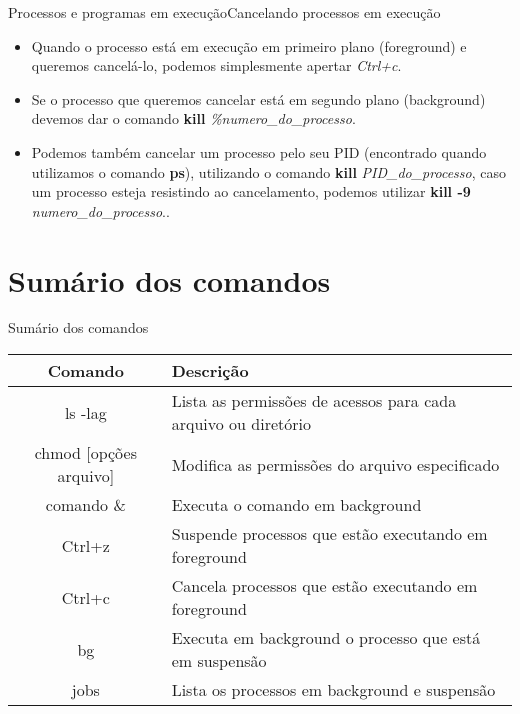 \documentclass{beamer}
\begin{document}
\begin{frame}{Processos e programas em execu\c{c}ão}{Cancelando processos em execu\c{c}ão}
  \begin{itemize}
  \item {Quando o processo está em execu\c{c}ão em primeiro plano (foreground) e queremos cancelá-lo, podemos simplesmente apertar \textit{Ctrl+c}.}
  \item {Se o processo que queremos cancelar está em segundo plano (background) devemos dar o comando \textbf{kill} \textit{ \%numero\_do\_processo}.}
  
  \item{Podemos também cancelar um processo pelo seu PID (encontrado quando utilizamos o comando \textbf{ps}), utilizando o comando \textbf{kill} \textit{ PID\_do\_processo}, caso um processo esteja resistindo ao cancelamento, podemos utilizar \textbf{kill -9} \textit{ numero\_do\_processo}.. }
  \end{itemize}
\end{frame}

\section*{Sumário dos comandos}

\begin{frame}{Sumário dos comandos}
\begin{center}
 \begin{tabular}{|| c | p{7cm}||} 
 \hline
 \textbf{Comando} & \textbf{Descri\c{c}ão}\\ [0.5ex] 
 \hline\hline
 ls -lag & Lista as permissões de acessos para cada arquivo ou diretório\\ 
 \hline
 chmod [op\c{c}ões arquivo] & Modifica as permissões do arquivo especificado\\
 \hline
 comando \& & Executa o comando em background\\
 \hline
 Ctrl+z & Suspende processos que estão executando em foreground\\
 \hline
 Ctrl+c & Cancela processos que estão executando em foreground\\
 \hline
 bg & Executa em background o processo que está em suspensão\\
 \hline
 jobs & Lista os processos em background e suspensão\\
 \hline
\end{tabular}
\end{center}
\end{frame}
\end{document}
